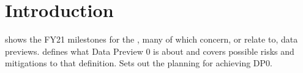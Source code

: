 \section{Introduction}
 shows the FY21 milestones for the \VRO, many of which
concern, or relate to, data previews.
 defines what Data Preview 0 is about and covers possible risks and mitigations to that
definition.
 Sets out the planning for achieving DP0.



